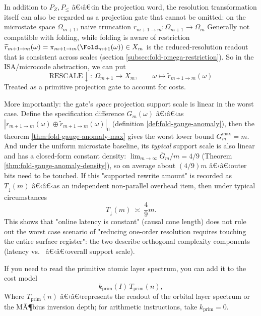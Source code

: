 \begin{remark}\label{rem:pom-rescale-gauge-anomaly}
In addition to \(P_Z,P_{\le}\) â€‹â€‹in the projection word, the resolution transformation itself can also be regarded as a projection gate that cannot be omitted: on the microstate space \(\Omega_{m+1}\), naive truncation
\(
r_{m+1\to m}:\Omega_{m+1}\to\Omega_m
\)
Generally not compatible with folding, while folding is aware of restriction
\(
\widetilde r_{m+1\to m}(\omega)=\pi_{m+1\to m}(\Fold_{m+1}(\omega))\in X_m
\)
is the reduced-resolution readout that is consistent across scales (section \ref{subsec:fold-omega-restriction}).
So in the ISA/microcode abstraction, we can put
$$
\mathrm{RESCALE}\downarrow:\ \Omega_{m+1}\to X_m,\qquad \omega\mapsto \widetilde r_{m+1\to m}(\omega)
$$
Treated as a primitive projection gate to account for costs.
\par
More importantly: the gate's \emph{space} projection support scale is linear in the worst case. Define the specification difference \(G_m(\omega)\) â€‹â€‹as
\(
|r_{m+1\to m}(\omega)\oplus \widetilde r_{m+1\to m}(\omega)|_0
\)
(definition \ref{def:fold-gauge-anomaly}), then the theorem \ref{thm:fold-gauge-anomaly-max} gives the worst lower bound \(G_m^{\max}=m\).
And under the uniform microstate baseline, its \emph{typical} support scale is also linear and has a closed-form constant density:
\(
\lim_{m\to\infty}\bar G_m/m=4/9
\)
(Theorem \ref{thm:fold-gauge-anomaly-density}), so on average about \((4/9)m\) â€‹â€‹outer bits need to be touched.
If this "supported rewrite amount" is recorded as \(T_{\downarrow}(m)\) â€‹â€‹as an independent non-parallel overhead item, then under typical circumstances
\[
T_{\downarrow}(m)\ \asymp\ \frac{4}{9}m.
\]
This shows that "online latency is constant" (causal cone length) does not rule out the worst case scenario of "reducing one-order resolution requires touching the entire surface register": the two describe orthogonal complexity components (latency vs. \  â€‹â€‹overall support scale).
\end{remark}

\begin{remark}\label{rem:pom-cost-prim}
If you need to read the primitive atomic layer spectrum, you can add it to the cost model
\[
k_{\mathrm{prim}}(I)\,T_{\mathrm{prim}}(n),
\]
Where $T_{\mathrm{prim}}(n)$ â€‹â€‹represents the readout of the orbital layer spectrum or the MÃ¶bius inversion depth; for arithmetic instructions, take $k_{\mathrm{prim}}=0$.
\end{remark}

